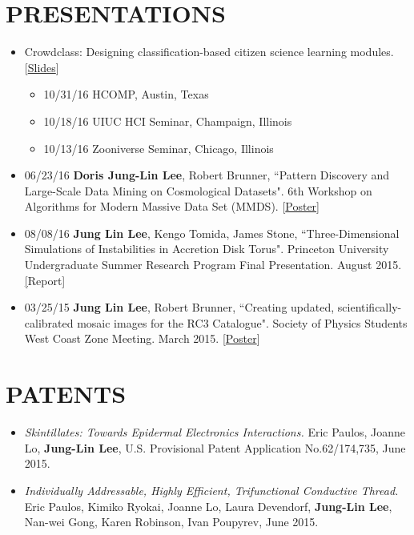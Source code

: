 \documentclass{res}
\begin{document}
\begin{resume}
\section{PRESENTATIONS}
\begin{itemize}
\item Crowdclass: Designing classification-based citizen science learning modules. [\href{http://dorisjunglinlee.com/files/crowdclass_slides.pdf}{Slides}]
	\begin{itemize}[label={$\circ$}]
	\item 10/31/16 HCOMP, Austin, Texas
	\item 10/18/16 UIUC HCI Seminar, Champaign, Illinois
	\item 10/13/16 Zooniverse Seminar, Chicago, Illinois
	\end{itemize}
\item 06/23/16 \textbf{Doris Jung-Lin Lee}, Robert Brunner, ``Pattern Discovery and Large-Scale Data Mining on Cosmological Datasets".  6th Workshop on Algorithms for Modern Massive Data Set (MMDS).  [\href{http://dorisjunglinlee.com/files/MMDS_poster.pdf}{Poster}]
\item 08/08/16 \textbf{Jung Lin Lee}, Kengo Tomida, James Stone, ``Three-Dimensional Simulations of Instabilities in Accretion Disk Torus". Princeton University Undergraduate Summer Research Program Final Presentation. August 2015. \href{http ://dorisjunglinlee.com/files/PrincetonUSRPreport.pdf}[{Report}]
\item 03/25/15 \textbf{Jung Lin Lee}, Robert Brunner, ``Creating updated, scientifically-calibrated mosaic images for the RC3 Catalogue". Society of Physics Students West Coast Zone Meeting. March 2015. [\href{http://dorisjunglinlee.com/files/rc3_poster_sps_zone_meeting.pdf}{Poster}]
\end{itemize}
\section{PATENTS}
\begin{itemize}
\item \textit{Skintillates: Towards Epidermal Electronics Interactions.} Eric Paulos, Joanne Lo, \textbf{Jung-Lin Lee}, U.S. Provisional Patent Application No.62/174,735, June 2015.
\item \textit{Individually Addressable, Highly Efficient, Trifunctional Conductive Thread.} Eric Paulos, Kimiko Ryokai, Joanne Lo, Laura Devendorf, \textbf{Jung-Lin Lee}, Nan-wei Gong, Karen Robinson, Ivan Poupyrev, June 2015.
\end{itemize}

\end{resume}
\end{document}
